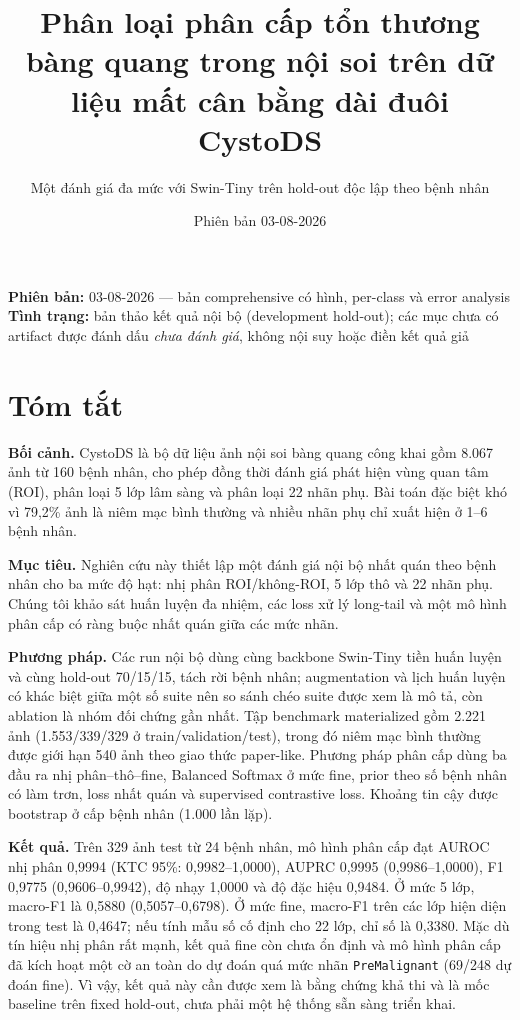 \documentclass[
  10pt,
  a4paper,
  twocolumn]{article}
\title{Phân loại phân cấp tổn thương bàng quang trong nội soi trên dữ
liệu mất cân bằng dài đuôi CystoDS}
\subtitle{Một đánh giá đa mức với Swin-Tiny trên hold-out độc lập theo
bệnh nhân}
\author{}
\date{Phiên bản 03-08-2026}
\begin{document}
\maketitle

\textbf{Phiên bản:} 03-08-2026 --- bản comprehensive có hình, per-class
và error analysis\\
\textbf{Tình trạng:} bản thảo kết quả nội bộ (development hold-out); các
mục chưa có artifact được đánh dấu \emph{chưa đánh giá}, không nội suy
hoặc điền kết quả giả

\section{Tóm tắt}\label{tuxf3m-tux1eaft}

\textbf{Bối cảnh.} CystoDS là bộ dữ liệu ảnh nội soi bàng quang công
khai gồm 8.067 ảnh từ 160 bệnh nhân, cho phép đồng thời đánh giá phát
hiện vùng quan tâm (ROI), phân loại 5 lớp lâm sàng và phân loại 22 nhãn
phụ. Bài toán đặc biệt khó vì 79,2\% ảnh là niêm mạc bình thường và
nhiều nhãn phụ chỉ xuất hiện ở 1--6 bệnh nhân.

\textbf{Mục tiêu.} Nghiên cứu này thiết lập một đánh giá nội bộ nhất
quán theo bệnh nhân cho ba mức độ hạt: nhị phân ROI/không-ROI, 5 lớp thô
và 22 nhãn phụ. Chúng tôi khảo sát huấn luyện đa nhiệm, các loss xử lý
long-tail và một mô hình phân cấp có ràng buộc nhất quán giữa các mức
nhãn.

\textbf{Phương pháp.} Các run nội bộ dùng cùng backbone Swin-Tiny tiền
huấn luyện và cùng hold-out 70/15/15, tách rời bệnh nhân; augmentation
và lịch huấn luyện có khác biệt giữa một số suite nên so sánh chéo suite
được xem là mô tả, còn ablation là nhóm đối chứng gần nhất. Tập
benchmark materialized gồm 2.221 ảnh (1.553/339/329 ở
train/validation/test), trong đó niêm mạc bình thường được giới hạn 540
ảnh theo giao thức paper-like. Phương pháp phân cấp dùng ba đầu ra nhị
phân--thô--fine, Balanced Softmax ở mức fine, prior theo số bệnh nhân có
làm trơn, loss nhất quán và supervised contrastive loss. Khoảng tin cậy
được bootstrap ở cấp bệnh nhân (1.000 lần lặp).

\textbf{Kết quả.} Trên 329 ảnh test từ 24 bệnh nhân, mô hình phân cấp
đạt AUROC nhị phân 0,9994 (KTC 95\%: 0,9982--1,0000), AUPRC 0,9995
(0,9986--1,0000), F1 0,9775 (0,9606--0,9942), độ nhạy 1,0000 và độ đặc
hiệu 0,9484. Ở mức 5 lớp, macro-F1 là 0,5880 (0,5057--0,6798). Ở mức
fine, macro-F1 trên các lớp hiện diện trong test là 0,4647; nếu tính mẫu
số cố định cho 22 lớp, chỉ số là 0,3380. Mặc dù tín hiệu nhị phân rất
mạnh, kết quả fine còn chưa ổn định và mô hình phân cấp đã kích hoạt một
cờ an toàn do dự đoán quá mức nhãn \texttt{PreMalignant} (69/248 dự đoán
fine). Vì vậy, kết quả này cần được xem là bằng chứng khả thi và là mốc
baseline trên fixed hold-out, chưa phải một hệ thống sẵn sàng triển
khai.
\end{document}
